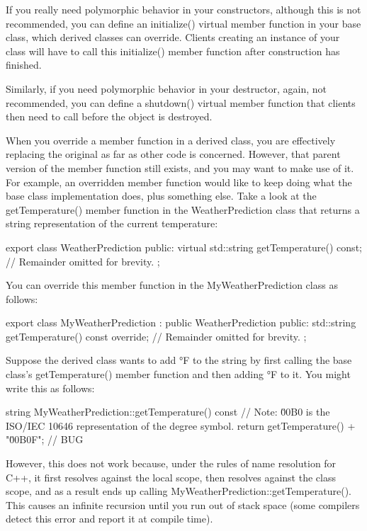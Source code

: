 If you really need polymorphic behavior in your constructors, although this is not recommended, you can define an initialize() virtual member function in your base class, which derived classes can override. Clients creating an instance of your class will have to call this initialize() member function after construction has finished.

Similarly, if you need polymorphic behavior in your destructor, again, not recommended, you can define a shutdown() virtual member function that clients then need to call before the object is destroyed.


When you override a member function in a derived class, you are effectively replacing the original as far as other code is concerned. However, that parent version of the member function still exists, and you may want to make use of it. For example, an overridden member function would like to keep doing what the base class implementation does, plus something else. Take a look at the getTemperature() member function in the WeatherPrediction class that returns a string representation of the current temperature:

\begin{cpp}
export class WeatherPrediction
{
    public:
        virtual std::string getTemperature() const;
        // Remainder omitted for brevity.
};
\end{cpp}

You can override this member function in the MyWeatherPrediction class as follows:

\begin{cpp}
export class MyWeatherPrediction : public WeatherPrediction
{
    public:
        std::string getTemperature() const override;
        // Remainder omitted for brevity.
};
\end{cpp}

Suppose the derived class wants to add °F to the string by first calling the base class’s getTemperature() member function and then adding °F to it. You might write this as follows:

\begin{cpp}
string MyWeatherPrediction::getTemperature() const
{
    // Note: \u00B0 is the ISO/IEC 10646 representation of the degree symbol.
    return getTemperature() + "\u00B0F"; // BUG
}
\end{cpp}

However, this does not work because, under the rules of name resolution for C++, it first resolves against the local scope, then resolves against the class scope, and as a result ends up calling MyWeatherPrediction::getTemperature(). This causes an infinite recursion until you run out of stack space (some compilers detect this error and report it at compile time).

